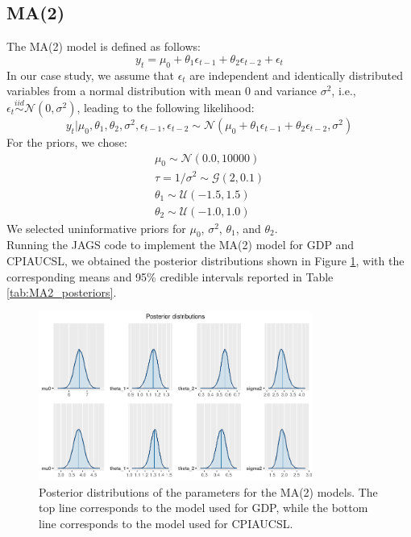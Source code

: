\subsection*{MA(2)}
The MA(2) model is defined as follows:
\begin{equation}
    \label{eq:MA2}
    y_{t} = \mu_{0} + \theta_1 \epsilon_{t-1} + \theta_2 \epsilon_{t-2} + \epsilon_t
\end{equation}
In our case study, we assume that $\epsilon_t$ are independent and identically distributed variables from a normal distribution with mean $0$ and variance $\sigma^2$, i.e., $\epsilon_t \stackrel{iid}{\sim} \mathcal{N}(0,\sigma^2)$, leading to the following likelihood:
\begin{equation}
    \label{eq:MA2_likelihood}
    y_{t}|\mu_{0},\theta_1,\theta_2,\sigma^2,\epsilon_{t-1},\epsilon_{t-2} \sim \mathcal{N}(\mu_{0} + \theta_1 \epsilon_{t-1} + \theta_2 \epsilon_{t-2}, \sigma^2)
\end{equation}
For the priors, we chose:
\begin{equation}
    \label{eq:MA2_priors}
    \begin{split}
        \mu_0 \sim \mathcal{N}(0.0, 10000) \\
        \tau = 1 / \sigma^2 \sim \mathcal{G}(2, 0.1) \\
        \theta_1 \sim \mathcal{U}(-1.5, 1.5) \\
        \theta_2 \sim \mathcal{U}(-1.0, 1.0)
    \end{split}
\end{equation}
We selected uninformative priors for $\mu_{0}$, $\sigma^2$, $\theta_1$, and $\theta_2$. \\
Running the JAGS code to implement the MA(2) model for GDP and CPIAUCSL, we obtained the posterior distributions shown in Figure \ref{fig:MA2_posteriors}, with the corresponding means and 95\% credible intervals reported in Table \ref{tab:MA2_posteriors}. \\
\begin{figure}[H]
    \centering
    \includegraphics[width=0.8\textwidth]{images/3-MA/posteriors2.png}
    \caption{Posterior distributions of the parameters for the MA(2) models. The top line corresponds to the model used for GDP, while the bottom line corresponds to the model used for CPIAUCSL.}
    \label{fig:MA2_posteriors}
\end{figure} 
